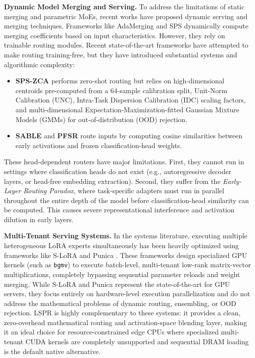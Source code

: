 \textbf{Dynamic Model Merging and Serving.} To address the limitations of static merging and parametric MoEs, recent works have proposed dynamic serving and merging techniques. Frameworks like AdaMerging \cite{adamerging2023} and SPS \cite{sps2024} dynamically compute merging coefficients based on input characteristics. However, they rely on trainable routing modules. Recent state-of-the-art frameworks have attempted to make routing training-free, but they have introduced substantial systems and algorithmic complexity:
\begin{itemize}
    \item \textbf{SPS-ZCA} \cite{sps_zca2025} performs zero-shot routing but relies on high-dimensional centroids pre-computed from a 64-sample calibration split, Unit-Norm Calibration (UNC), Intra-Task Dispersion Calibration (IDC) scaling factors, and multi-dimensional Expectation-Maximization-fitted Gaussian Mixture Models (GMMs) for out-of-distribution (OOD) rejection.
    \item \textbf{SABLE} \cite{sable2025} and \textbf{PFSR} \cite{pfsr2025} route inputs by computing cosine similarities between early activations and frozen classification-head weights.
\end{itemize}

These head-dependent routers have major limitations. First, they cannot run in settings where classification heads do not exist (e.g., autoregressive decoder layers, or head-free embedding extraction). Second, they suffer from the \emph{Early-Layer Routing Paradox}, where task-specific adapters must run in parallel throughout the entire depth of the model before classification-head similarity can be computed. This causes severe representational interference and activation dilution in early layers.

\textbf{Multi-Tenant Serving Systems.} In the systems literature, executing multiple heterogeneous LoRA experts simultaneously has been heavily optimized using frameworks like S-LoRA \cite{slora2024} and Punica \cite{punica2024}. These frameworks design specialized GPU kernels (such as \texttt{bgmv}) to execute batch-level, multi-tenant low-rank matrix-vector multiplications, completely bypassing sequential parameter reloads and weight merging. While S-LoRA and Punica represent the state-of-the-art for GPU servers, they focus entirely on hardware-level execution parallelization and do not address the mathematical problems of dynamic routing, ensembling, or OOD rejection. LSPR is highly complementary to these systems: it provides a clean, zero-overhead mathematical routing and activation-space blending layer, making it an ideal choice for resource-constrained edge CPUs where specialized multi-tenant CUDA kernels are completely unsupported and sequential DRAM loading is the default native alternative.

